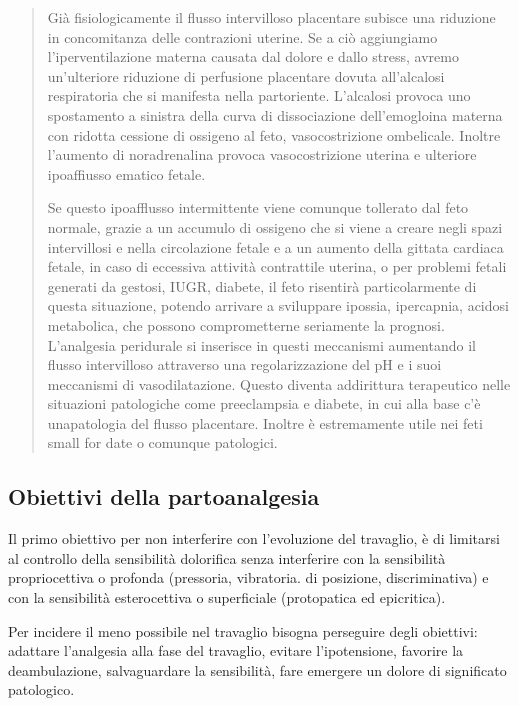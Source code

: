 \documentclass[]{article}
\begin{document}
\begin{quote}
Già fisiologicamente il flusso intervilloso placentare subisce una
riduzione in concomitanza delle contrazioni uterine. Se a ciò
aggiungiamo l'iperventilazione materna causata dal dolore e dallo
stress, avremo un'ulteriore riduzione di perfusione placentare dovuta
all'alcalosi respiratoria che si manifesta nella partoriente. L'alcalosi
provoca uno spostamento a sinistra della curva di dissociazione
dell'emogloina materna con ridotta cessione di ossigeno al feto,
vasocostrizione ombelicale. Inoltre l'aumento di noradrenalina provoca
vasocostrizione uterina e ulteriore ipoaffiusso ematico fetale.

Se questo ipoafflusso intermittente viene comunque tollerato dal feto
normale, grazie a un accumulo di ossigeno che si viene a creare negli
spazi intervillosi e nella circolazione fetale e a un aumento della
gittata cardiaca fetale, in caso di eccessiva attività contrattile
uterina, o per problemi fetali generati da gestosi, IUGR, diabete, il
feto risentirà particolarmente di questa situazione, potendo arrivare a
sviluppare ipossia, ipercapnia, acidosi metabolica, che possono
comprometterne seriamente la prognosi. L'analgesia peridurale si
inserisce in questi meccanismi aumentando il flusso intervilloso
attraverso una regolarizzazione del pH e i suoi meccanismi di
vasodilatazione. Questo diventa addirittura terapeutico nelle situazioni
patologiche come preeclampsia e diabete, in cui alla base c'è
unapatologia del flusso placentare. Inoltre è estremamente utile nei
feti small for date o comunque patologici.
\end{quote}

\hypertarget{obiettivi-della-partoanalgesia}{%
\subsection{Obiettivi della
partoanalgesia}\label{obiettivi-della-partoanalgesia}}

Il primo obiettivo per non interferire con l'evoluzione del travaglio, è
di limitarsi al controllo della sensibilità dolorifica senza interferire
con la sensibilità propriocettiva o profonda (pressoria, vibratoria. di
posizione, discriminativa) e con la sensibilità esterocettiva o
superficiale (protopatica ed epicritica).

Per incidere il meno possibile nel travaglio bisogna perseguire degli
obiettivi: adattare l'analgesia alla fase del travaglio, evitare
l'ipotensione, favorire la deambulazione, salvaguardare la sensibilità,
fare emergere un dolore di significato patologico.
\end{document}
